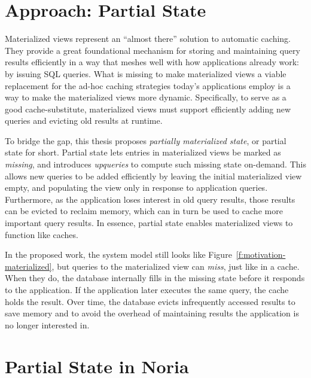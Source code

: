 \section{Approach: Partial State}

Materialized views represent an ``almost there'' solution to automatic caching.
They provide a great foundational mechanism for storing and maintaining query
results efficiently in a way that meshes well with how applications already
work: by issuing SQL queries. What is missing to make materialized views a
viable replacement for the ad-hoc caching strategies today's applications employ
is a way to make the materialized views more dynamic. Specifically, to serve as
a good cache-substitute, materialized views must support efficiently adding new
queries and evicting old results at runtime.

To bridge the gap, this thesis proposes \textit{partially materialized state},
or partial state for short. Partial state lets entries in materialized views be
marked as \textit{missing}, and introduces \textit{upqueries} to compute such
missing state on-demand. This allows new queries to be added efficiently by
leaving the initial materialized view empty, and populating the view only in
response to application queries. Furthermore, as the application loses interest
in old query results, those results can be evicted to reclaim memory, which can
in turn be used to cache more important query results. In essence, partial state
enables materialized views to function like caches.

In the proposed work, the system model still looks like
Figure~\vref{f:motivation-materialized}, but queries to the materialized view
can \emph{miss}, just like in a cache. When they do, the database internally
fills in the missing state before it responds to the application. If the
application later executes the same query, the cache holds the result. Over
time, the database evicts infrequently accessed results to save memory and to
avoid the overhead of maintaining results the application is no longer
interested in.

\section{Partial State in Noria}

